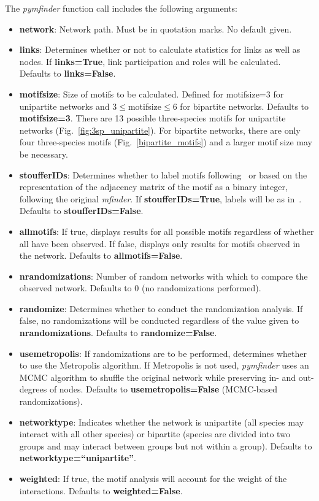 \documentclass[12pt]{article}
\begin{document}
			The \emph{pymfinder} function call includes the following arguments:
     	\begin{itemize}
     		\item \textbf{network}: Network path. Must be in quotation marks. No default given.
				\item \textbf{links}: Determines whether or not to calculate statistics for links as well as nodes. If \textbf{links=True}, link participation and roles will be calculated. Defaults to \textbf{links=False}.
				\item \textbf{motifsize}: Size of motifs to be calculated. Defined for motifsize=3 for unipartite networks and 3$\leq$motifsize$\leq$6 for bipartite networks. Defaults to \textbf{motifsize=3}. There are 13 possible three-species motifs for unipartite networks (Fig.~\ref{fig:3sp_unipartite}). For bipartite networks, there are only four three-species motifs (Fig.~\ref{bipartite_motifs}) and a larger motif size may be necessary.
				\item \textbf{stoufferIDs}: Determines whether to label motifs following~\citet{Stouffer2007} or based on the representation of the adjacency matrix of the motif as a binary integer, following the original \emph{mfinder}. If \textbf{stoufferIDs=True}, labels will be as in~\citet{Stouffer2007}. Defaults to \textbf{stoufferIDs=False}.
				\item \textbf{allmotifs}: If true, displays results for all possible motifs regardless of whether all have been observed. If false, displays only results for motifs observed in the network. Defaults to \textbf{allmotifs=False}.
				\item \textbf{nrandomizations}: Number of random networks with which to compare the observed network. Defaults to 0 (no randomizations performed).
				\item \textbf{randomize}: Determines whether to conduct the randomization analysis. If false, no randomizations will be conducted regardless of the value given to \textbf{nrandomizations}. Defaults to \textbf{randomize=False}.
				\item \textbf{usemetropolis}: If randomizations are to be performed, determines whether to use the Metropolis algorithm. If Metropolis is not used, \emph{pymfinder} uses an MCMC algorithm to shuffle the original network while preserving in- and out-degrees of nodes. Defaults to \textbf{usemetropolis=False} (MCMC-based randomizations).
				\item \textbf{networktype}: Indicates whether the network is unipartite (all species may interact with all other species) or bipartite (species are divided into two groups and may interact between groups but not within a group). Defaults to \textbf{networktype=``unipartite''}.
				\item \textbf{weighted}: If true, the motif analysis will account for the weight of the interactions. Defaults to \textbf{weighted=False}.
			\end{itemize}
\end{document}
